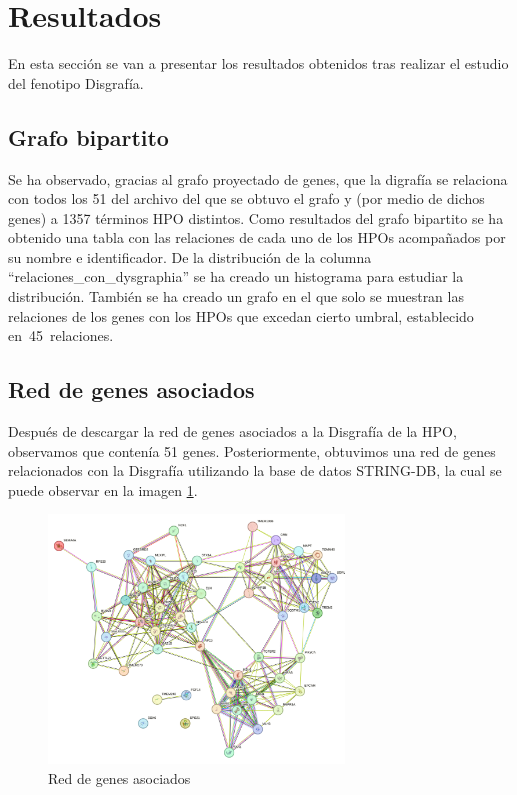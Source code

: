 
\section{Resultados}

En esta sección se van a presentar los resultados obtenidos tras realizar el estudio del fenotipo Disgrafía.

\subsection{Grafo bipartito}

Se ha observado, gracias al grafo proyectado de genes, que la digrafía se relaciona con todos los 51 del archivo del que se obtuvo el grafo y (por medio de dichos genes) a 1357 términos HPO distintos. Como resultados del grafo bipartito se ha obtenido una tabla con las relaciones de cada uno de los HPOs acompañados por su nombre e identificador. 
De la distribución de la columna “relaciones\_con\_dysgraphia” se ha creado un histograma para estudiar la distribución. También se ha creado un grafo en el que solo se muestran las relaciones de los genes con los HPOs que excedan cierto umbral, establecido en 45 relaciones.

\subsection{Red de genes asociados}

Después de descargar la red de genes asociados a la Disgrafía de la HPO, observamos que contenía 51 genes. Posteriormente, obtuvimos una red de genes relacionados con la Disgrafía utilizando la base de datos STRING-DB, la cual se puede observar en la imagen \ref{fig:genesAsociados}.

\begin{figure}[h!]
	\centering
	\includegraphics[width=0.7\textwidth]{figures/stringdb_51_genes.png}
	\caption{Red de genes asociados}
	\label{fig:genesAsociados}
\end{figure}

